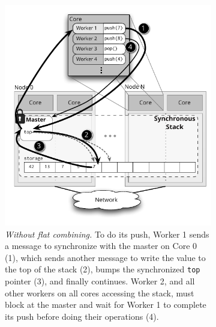 \begin{figure}[t]
  \centering
  \begin{subfigure}[b]{0.43\textwidth}
    \includegraphics[width=\textwidth]{figs/stack_nofc.pdf}
    \caption{\emph{Without flat combining.}
      To do its push, Worker 1 sends a message to synchronize with the master on Core 0 (1), which sends another message to write the value to the top of the stack (2), bumps the synchronized \texttt{top} pointer (3), and finally continues. Worker 2, and all other workers on all cores accessing the stack, must block at the master and wait for Worker 1 to complete its push before doing their operations (4).
    }
    \label{fig:stacknofc}
  \end{subfigure}%
  \hspace{0.05\textwidth}
  \begin{subfigure}[b]{0.43\textwidth}
    \centering

\end{subfigure}
\end{figure}
